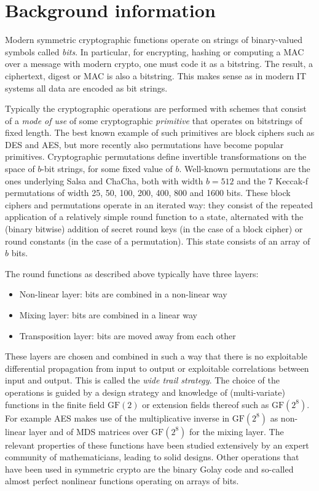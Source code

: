 \documentclass{article}
\newcommand{\gftwo}{{\text{GF}(2)}}
\newcommand{\gfpar}[2]{{\text{GF}({#1}^{#2})}}
\begin{document}
\section{Background information}



Modern symmetric cryptographic functions operate on strings of binary-valued symbols called \emph{bits}. In particular, for encrypting, hashing or computing a MAC over a message with modern crypto, one must code it as a bitstring. The result, a ciphertext, digest or MAC is also a bitstring. This makes sense as in modern IT systems all data are encoded as bit strings.

Typically the cryptographic operations are performed with schemes that consist of a \emph{mode of use} of some cryptographic \emph{primitive} that operates on bitstrings of fixed length. The best known example of such primitives are block ciphers such as DES and AES, but more recently also permutations have become popular primitives. Cryptographic permutations define invertible transformations on the space of $b$-bit strings, for some fixed value of $b$. Well-known permutations are the ones underlying Salsa and ChaCha, both with width $b=512$ and the 7 Keccak-f permutations of width 25, 50, 100, 200, 400, 800 and 1600 bits. These block ciphers and permutations operate in an iterated way: they consist of the repeated application of a relatively simple round function to a state, alternated with the (binary bitwise) addition of secret round keys (in the case of a block cipher) or round constants (in the case of a permutation). This state consists of an array of $b$ bits.

The round functions as described above typically have three layers:
\begin{itemize}
	\item Non-linear layer: bits are combined in a non-linear way
	\item Mixing layer: bits are combined in a linear way
	\item Transposition layer: bits are moved away from each other
\end{itemize}
These layers are chosen and combined in such a way that there is no exploitable differential propagation from input to output or exploitable correlations between input and output. This is called the \emph{wide trail strategy}. The choice of the operations is guided by a design strategy and knowledge of (multi-variate) functions in the finite field $\gftwo$ or extension fields thereof such as $\gfpar{2}{8}$. For example AES makes use of the multiplicative inverse in $\gfpar{2}{8}$ as non-linear layer and of MDS matrices over $\gfpar{2}{8}$ for the mixing layer. The relevant properties of these functions have been studied extensively by an expert community of mathematicians, leading to solid designs. Other operations that have been used in symmetric crypto are the binary Golay code and so-called almost perfect nonlinear functions operating on arrays of bits.
\end{document}
